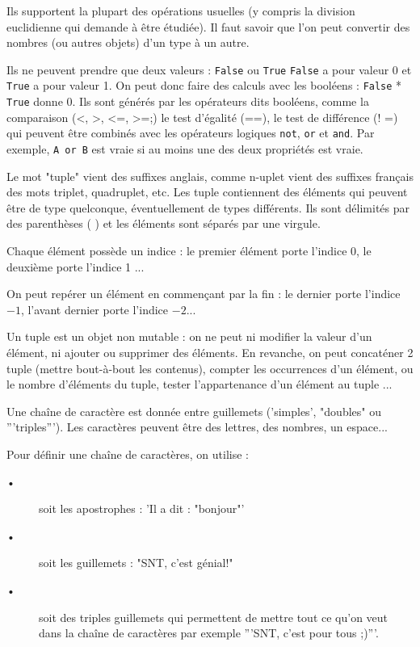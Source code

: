 
Ils supportent la plupart des opérations usuelles (y compris la division euclidienne qui demande à être étudiée). Il faut
savoir que l'on peut convertir des nombres (ou autres objets) d'un type à un autre.


Ils ne peuvent prendre que deux valeurs : \texttt{False} ou \texttt{True}
\texttt{False} a pour valeur 0 et \texttt{True} a pour valeur 1. On peut donc faire des calculs avec les booléens : \texttt{False} * \texttt{True} donne 0.
Ils sont générés par les opérateurs dits booléens, comme la comparaison (<, >, <=, >=;) le test d’égalité (==), le test
de différence (! =)  qui peuvent être combinés avec les opérateurs logiques \texttt{not}, \texttt{or} et \texttt{and}. Par exemple, \texttt{A or B} est vraie si au moins une des deux propriétés est vraie.


Le mot "tuple" vient des suffixes anglais, comme n-uplet vient des suffixes français des mots triplet, quadruplet, etc.
Les tuple contiennent des éléments qui peuvent être de type quelconque, éventuellement de types différents. Ils sont
délimités par des parenthèses ( ) et les éléments sont séparés par une virgule.

Chaque élément possède un indice : le premier élément porte l’indice 0, le deuxième porte l’indice 1 ...

On peut repérer un élément en commençant par la fin : le dernier porte l’indice $-1$, l’avant dernier porte l’indice $-2$...

Un tuple est un objet non mutable : on ne peut ni modifier la valeur d’un élément, ni ajouter ou supprimer des éléments.
En revanche, on peut concaténer 2 tuple (mettre bout-à-bout les contenus), compter les occurrences d’un élément, ou le
nombre d’éléments du tuple, tester l’appartenance d’un élément au tuple ...


Une chaîne de caractère est donnée entre guillemets (’simples’, "doubles" ou ”’triples”’). Les caractères peuvent être des
lettres, des nombres, un espace...

Pour définir une chaîne de caractères, on utilise :
\begin{description}
\item[•] soit les apostrophes : ’Il a dit : "bonjour"’
\item[•] soit les guillemets : "SNT, c’est génial!"
\item[•] soit des triples guillemets qui permettent de mettre tout ce qu’on veut dans la chaîne de caractères par exemple
”’SNT, c’est pour tous ;)”’.
\end{description}
  
